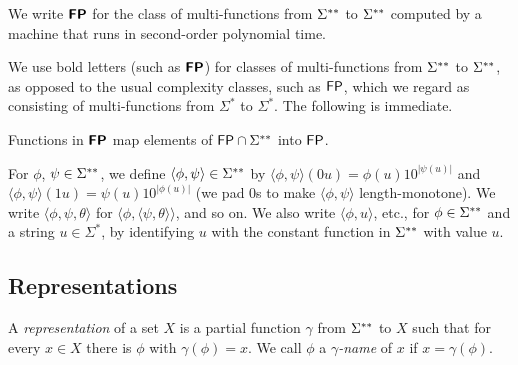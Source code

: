 \documentclass[envcountsect,envcountsame,orivec,oribibl]{llncs}
\begin{document}
\begin{definition}
 We write $\text{\bfseries \sffamily \upshape FP}$ for the class of
 multi-functions from $\Sigma ^{**}$ to $\Sigma ^{**}$ 
 computed by a machine that runs
 in second-order polynomial time.
\end{definition}

We use bold letters (such as $\text{\bfseries \sffamily \upshape FP}$) 
for classes of multi-functions from $\Sigma ^{**}$ to $\Sigma ^{**}$, 
as opposed to the usual complexity classes, such as $\mathsf{FP}$, 
which we regard as consisting of multi-functions from $\Sigma ^*$ to $\Sigma ^*$.
The following is immediate. 

\begin{lemma}
\label{label: classFPtwo maps classFP to classFP}
 Functions in $\text{\bfseries \sffamily \upshape FP}$ map 
 elements of $\mathsf{FP} \cap \Sigma ^{**}$ into $\mathsf{FP}$.
\end{lemma}

For $\phi$, $\psi \in \Sigma ^{**}$, 
we define $\langle \phi, \psi \rangle \in \Sigma ^{**}$ by 
$\langle \phi, \psi \rangle(0u) = \phi(u) 10^{|\psi(u)|}$ and 
$\langle \phi, \psi \rangle(1u) = \psi(u) 10^{|\phi(u)|}$
(we pad $0$s to make $\langle \phi, \psi \rangle$ length-monotone).
We write $\langle \phi, \psi, \theta \rangle$ 
for $\langle \phi, \langle \psi, \theta \rangle \rangle$, and so on.
We also write $\langle \phi, u \rangle$, etc., for 
$\phi \in \Sigma ^{**}$ and a string $u \in \Sigma ^*$, 
by identifying $u$ with the constant function in $\Sigma ^{**}$ with value $u$. 

\subsection{Representations}
\label{subsection: representations}

A \emph{representation} of a set $X$ 
is a partial function $\gamma$ from $\Sigma ^{**}$ to $X$
such that for every $x \in X$ there is $\phi$ with $\gamma (\phi) = x$.
We call $\phi$ a {\em $\gamma$-name} of $x$
if $x = \gamma (\phi)$.
\end{document}
